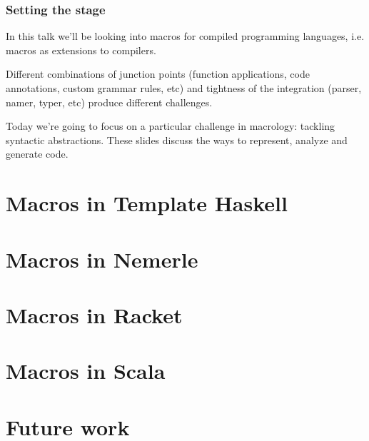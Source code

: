 \documentclass[hyperref={bookmarks=false}]{beamer}
\begin{document}
\begin{frame}[fragile]
\frametitle{Setting the stage}

In this talk we'll be looking into macros for compiled programming languages,
i.e. macros as extensions to compilers.

Different combinations of junction points (function applications, code annotations, custom grammar rules, etc)
and tightness of the integration (parser, namer, typer, etc) produce different challenges.

Today we're going to focus on a particular challenge in macrology: tackling syntactic abstractions.
These slides discuss the ways to represent, analyze and generate code.
\end{frame}

\section{Macros in Template Haskell}

\section{Macros in Nemerle}

\section{Macros in Racket}

\section{Macros in Scala}

\section{Future work}
\end{document}
